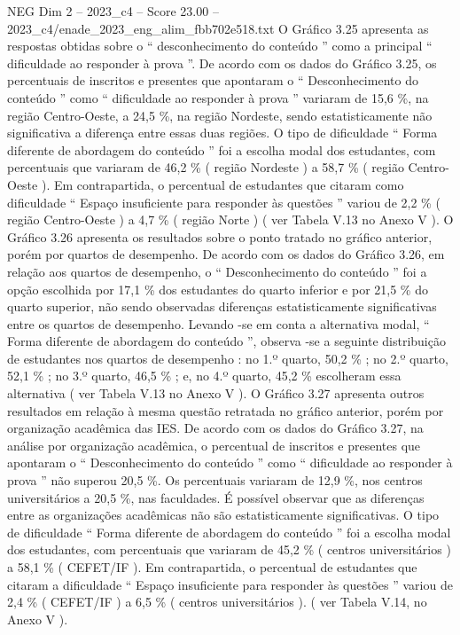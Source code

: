 \begin{textsample}{NEG Dim 2 – 2023\_c4 – Score 23.00 – 2023\_c4/enade\_2023\_eng\_alim\_fbb702e518.txt}
O Gráfico 3.25 apresenta as respostas obtidas sobre o “ desconhecimento do conteúdo ” como a principal “ dificuldade ao responder à prova ”.
De acordo com os dados do Gráfico 3.25, os percentuais de inscritos e presentes que apontaram o “ Desconhecimento do conteúdo ” como “ dificuldade ao responder à prova ” variaram de 15,6 \%, na região Centro-Oeste, a 24,5 \%, na região Nordeste, sendo estatisticamente não significativa a diferença entre essas duas regiões.
O tipo de dificuldade “ Forma diferente de abordagem do conteúdo ” foi a escolha modal dos estudantes, com percentuais que variaram de 46,2 \% ( região Nordeste ) a 58,7 \% ( região Centro-Oeste ).
Em contrapartida, o percentual de estudantes que citaram como dificuldade “ Espaço insuficiente para responder às questões ” variou de 2,2 \% ( região Centro-Oeste ) a 4,7 \% ( região Norte ) ( ver Tabela V.13 no Anexo V ).
O Gráfico 3.26 apresenta os resultados sobre o ponto tratado no gráfico anterior, porém por quartos de desempenho.
De acordo com os dados do Gráfico 3.26, em relação aos quartos de desempenho, o “ Desconhecimento do conteúdo ” foi a opção escolhida por 17,1 \% dos estudantes do quarto inferior e por 21,5 \% do quarto superior, não sendo observadas diferenças estatisticamente significativas entre os quartos de desempenho.
Levando -se em conta a alternativa modal, “ Forma diferente de abordagem do conteúdo ”, observa -se a seguinte distribuição de estudantes nos quartos de desempenho : no 1.º quarto, 50,2 \% ; no 2.º quarto, 52,1 \% ; no 3.º quarto, 46,5 \% ; e, no 4.º quarto, 45,2 \% escolheram essa alternativa ( ver Tabela V.13 no Anexo V ).
O Gráfico 3.27 apresenta outros resultados em relação à mesma questão retratada no gráfico anterior, porém por organização acadêmica das IES.
De acordo com os dados do Gráfico 3.27, na análise por organização acadêmica, o percentual de inscritos e presentes que apontaram o “ Desconhecimento do conteúdo ” como “ dificuldade ao responder à prova ” não superou 20,5 \%.
Os percentuais variaram de 12,9 \%, nos centros universitários a 20,5 \%, nas faculdades.
É possível observar que as diferenças entre as organizações acadêmicas não são estatisticamente significativas.
O tipo de dificuldade “ Forma diferente de abordagem do conteúdo ” foi a escolha modal dos estudantes, com percentuais que variaram de 45,2 \% ( centros universitários ) a 58,1 \% ( CEFET/IF ).
Em contrapartida, o percentual de estudantes que citaram a dificuldade “ Espaço insuficiente para responder às questões ” variou de 2,4 \% ( CEFET/IF ) a 6,5 \% ( centros universitários ). ( ver Tabela V.14, no Anexo V ).

\end{textsample}
